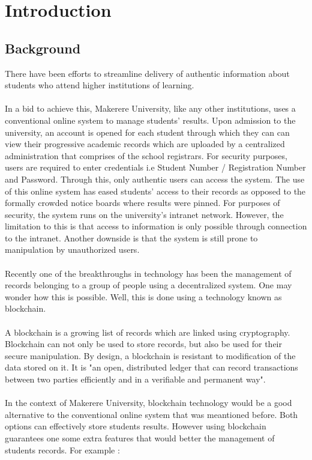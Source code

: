 \chapter{Introduction}

\section{Background}
There have been efforts to streamline delivery of authentic information about students who attend higher institutions of learning. \\~\\
In a bid to achieve this, Makerere University, like any other institutions, uses a conventional online system to manage students' results. Upon admission to the university, an account is opened for each student through which they can can view their progressive academic records which are uploaded by a centralized administration that comprises of the school registrars. For security purposes, users are required to enter credentials i.e Student Number / Registration Number and Password. Through this, only authentic users can access the system. The use of this online system has eased students' access to their records as opposed to the formally crowded notice boards where results were pinned. For purposes of security, the system runs on the university's intranet network. However, the limitation to this is that access to information is only possible through connection to the intranet. Another downside is that the system is still prone to manipulation by unauthorized users.\\\\
Recently one of the breakthroughs in technology has been the management of records belonging to a group of people using a decentralized system. One may wonder how this is possible. Well, this is done using a technology known as blockchain.\\\\
A blockchain is a growing list of records which are linked using cryptography\cite{art2}. Blockchain can not only be used to store records, but also be used for their secure manipulation. By design, a blockchain is resistant to modification of the data stored on it. It is "an open, distributed ledger that can record transactions between two parties efficiently and in a verifiable and permanent way".\\\\
In the context of Makerere University, blockchain technology would be a good alternative to the conventional online system that was meantioned before. Both options can effectively store students results. However using blockchain guarantees one some extra features that would better the management of students records. For example \cite{art3} :\\\\
